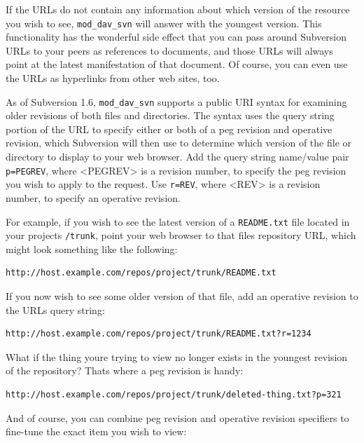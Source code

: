 If the URLs do not contain any information about which version of the
resource you wish to see, \texttt{mod\_dav\_svn} will answer with the
youngest version. This functionality has the wonderful side effect that
you can pass around Subversion URLs to your peers as references to
documents, and those URLs will always point at the latest manifestation
of that document. Of course, you can even use the URLs as hyperlinks
from other web sites, too.

As of Subversion 1.6, \texttt{mod\_dav\_svn} supports a public URI
syntax for examining older revisions of both files and directories. The
syntax uses the query string portion of the URL to specify either or
both of a peg revision and operative revision, which Subversion will
then use to determine which version of the file or directory to display
to your web browser. Add the query string name/value pair
\texttt{p=PEGREV}, where \textless PEGREV\textgreater{} is a revision
number, to specify the peg revision you wish to apply to the request.
Use \texttt{r=REV}, where \textless REV\textgreater{} is a revision
number, to specify an operative revision.

For example, if you wish to see the latest version of a
\texttt{README.txt} file located in your project\textquotesingle s
\texttt{/trunk}, point your web browser to that file\textquotesingle s
repository URL, which might look something like the following:

\begin{verbatim}
http://host.example.com/repos/project/trunk/README.txt
\end{verbatim}

If you now wish to see some older version of that file, add an operative
revision to the URL\textquotesingle s query string:

\begin{verbatim}
http://host.example.com/repos/project/trunk/README.txt?r=1234
\end{verbatim}

What if the thing you\textquotesingle re trying to view no longer exists
in the youngest revision of the repository? That\textquotesingle s where
a peg revision is handy:

\begin{verbatim}
http://host.example.com/repos/project/trunk/deleted-thing.txt?p=321
\end{verbatim}

And of course, you can combine peg revision and operative revision
specifiers to fine-tune the exact item you wish to view:

